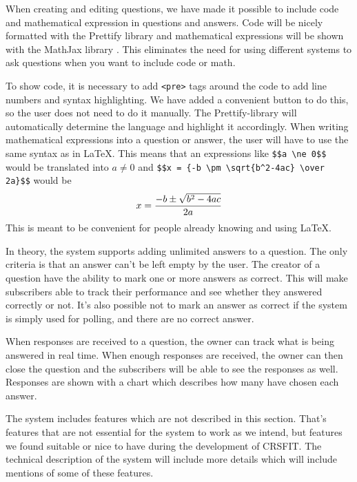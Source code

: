 When creating and editing questions, we have made it possible to include code and mathematical expression in questions and answers. Code will be nicely formatted with the Prettify library \cite{google/code-prettify_2016} and mathematical expressions will be shown with the MathJax library \cite{mathjax_2016}. This eliminates the need for using different systems to ask questions when you want to include code or math. 

To show code, it is necessary to add \texttt{<pre>} tags around the code to add line numbers and syntax highlighting. We have added a convenient button to do this, so the user does not need to do it manually. The Prettify-library will automatically determine the language and highlight it accordingly. When writing mathematical expressions into a question or answer, the user will have to use the same syntax as in \LaTeX. This means that an expressions like \verb|$$a \ne 0$$| would be translated into $a \ne 0$ and \verb|$$x = {-b \pm \sqrt{b^2-4ac} \over 2a}$$| would be 
$$x = {-b \pm \sqrt{b^2-4ac} \over 2a}$$
This is meant to be convenient for people already knowing and using \LaTeX.

In theory, the system supports adding unlimited answers to a question. The only criteria is that an answer can't be left empty by the user. The creator of a question have the ability to mark one or more answers as correct. This will make subscribers able to track their performance and see whether they answered correctly or not. It's also possible not to mark an answer as correct if the system is simply used for polling, and there are no correct answer.

When responses are received to a question, the owner can track what is being answered in real time. When enough responses are received, the owner can then close the question and the subscribers will be able to see the responses as well. Responses are shown with a chart which describes how many have chosen each answer.

The system includes features which are not described in this section. That's features that are not essential for the system to work as we intend, but features we found suitable or nice to have during the development of CRSFIT. The technical description of the system will include more details which will include mentions of some of these features.